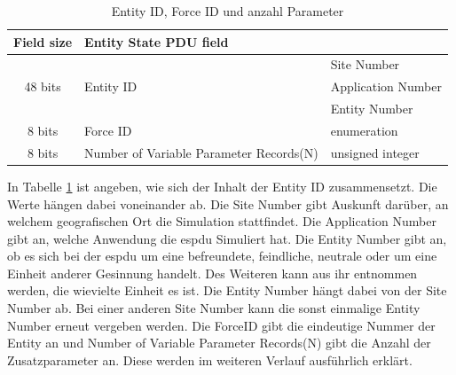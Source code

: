 \begin{table}[H]
	\begin{tabular}{|c|l|l|}
		\hline
		Field size             & \multicolumn{2}{l|}{Entity State PDU field}                  \\ \hline
		\multirow{3}{*}{48 bits}    & \multirow{3}{*}{Entity ID}              & Site Number        \\ \cline{3-3} 
		&                                         & Application Number \\ \cline{3-3} 
		&                                         & Entity Number      \\ \hline
		8 bits                      & Force ID                                & enumeration        \\ \hline
		8 bits                     & Number of Variable Parameter Records(N) & unsigned integer   \\ \hline
	
	\end{tabular}
\caption[Entity ID, Force ID und anzahl Parameter]{Entity ID, Force ID und anzahl Parameter\cite{SISOStandardsActivityCommitteeoftheIEEEComputerSociety.}}
\label{ids}
\end{table}
In Tabelle \ref{ids} ist angeben, wie sich der Inhalt der Entity ID zusammensetzt.
Die Werte hängen dabei voneinander ab. Die  \glqq Site Number\grqq{} gibt Auskunft darüber, an welchem geografischen Ort die Simulation stattfindet.
Die \glqq Application Number\grqq{} gibt an, welche Anwendung die \ac{espdu} Simuliert hat. Die \glqq Entity Number\grqq{} gibt an, ob es sich bei der \ac{espdu} um eine befreundete, feindliche, neutrale oder um eine Einheit anderer Gesinnung handelt. Des Weiteren kann aus ihr entnommen werden, die wievielte Einheit es ist. Die \glqq Entity Number\grqq{} hängt dabei von der \glqq Site Number\grqq{} ab. Bei einer anderen \glqq Site Number\grqq{} kann die sonst einmalige \glqq Entity Number\grqq{} erneut vergeben werden. Die \glqq ForceID\grqq{} gibt die eindeutige Nummer der Entity an und \glqq Number of Variable Parameter Records(N)\grqq{} gibt die Anzahl der Zusatzparameter an. Diese werden im weiteren Verlauf ausführlich erklärt. 


